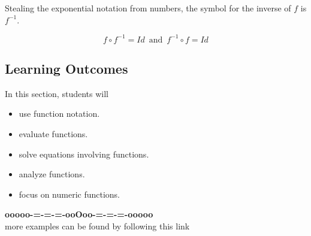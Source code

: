 \documentclass{ximera}
\begin{document}
Stealing the exponential notation from numbers, the symbol for the inverse of $f$ is $f^{-1}$.

\[   f \circ f^{-1} = Id    \, \text{ and } \, f^{-1} \circ f = Id       \]



















\subsection*{Learning Outcomes}
\hfill\break

\begin{sectionOutcomes}
In this section, students will 

\begin{itemize}
\item use function notation.
\item evaluate functions.
\item solve equations involving functions.
\item analyze functions.
\item focus on numeric functions.
\end{itemize}
\end{sectionOutcomes}













\begin{onlineOnly}
\begin{center}
\textbf{\textcolor{green!50!black}{ooooo-=-=-=-ooOoo-=-=-=-ooooo}} \\

more examples can be found by following this link\\ 

\end{center}
\end{onlineOnly}
\end{document}
